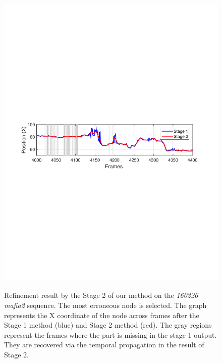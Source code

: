 \begin{figure}[t]
	\centering
	\captionsetup{position=top}
	\includegraphics[trim=40 340 60 340,clip,width=0.8\linewidth]{figures/quant_stage2/160226_mafia2-Stage2-nodeLocation-h7-j11-1.pdf}   \\
	\caption{Refinement result by the Stage 2 of our method on the \emph{160226 mafia2} sequence. The most erroneous node is selected. The graph represents the X coordinate of the node across frames after the Stage 1 method (blue) and Stage 2 method (red). The gray regions represent the frames where the part is missing in the stage 1 output. They are recovered via the temporal propagation in the result of Stage 2. } 
	\label{fig:quant_stage2}
\end{figure}



